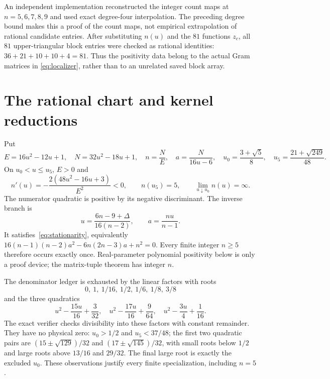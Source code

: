 \documentclass[11pt]{article}
\begin{document}
An independent implementation reconstructed the integer count maps at
$n=5,6,7,8,9$ and used exact degree-four interpolation. The preceding
degree bound makes this a proof of the count maps, not empirical
extrapolation of rational candidate entries. After substituting $n(u)$
and the $81$ functions $z_c$, all $81$ upper-triangular block entries
were checked as rational identities: $36+21+10+10+4=81$.
Thus the positivity data belong to the actual Gram matrices in
\eqref{eq:localizer}, rather than to an unrelated saved block array.

\section{The rational chart and kernel reductions}\label{sec:chart}
Put
\begin{equation}\label{eq:chart}
 E=16u^2-12u+1,\quad N=32u^2-18u+1,\quad
 n=\frac NE,\quad a=\frac N{16u-6},\quad
 u_0=\frac{3+\sqrt5}{8},\quad u_5=\frac{21+\sqrt{249}}{48}.
\end{equation}
On $u_0<u\le u_5$, $E>0$ and
\[
 n'(u)=-\frac{2(48u^2-16u+3)}{E^2}<0,
 \qquad n(u_5)=5,\qquad \lim_{u\downarrow u_0}n(u)=\infty.
\]
The numerator quadratic is positive by its negative discriminant.
The inverse branch is
\[
 u=\frac{6n-9+\Delta}{16(n-2)},\qquad a=\frac{nu}{n-1}.
\]
It satisfies~\eqref{eq:stationarity}, equivalently
$16(n-1)(n-2)a^2-6n(2n-3)a+n^2=0$.
Every finite integer $n\ge5$ therefore occurs exactly once.
Real-parameter polynomial positivity below is only a proof device;
the matrix-tuple theorem has integer $n$.

The denominator ledger is exhausted by the linear factors with roots
\[
 0,\ 1,\ 1/16,\ 1/2,\ 1/6,\ 1/8,\ 3/8
\]
and the three quadratics
\begin{equation}\label{eq:denoms}
 u^2-\frac{15u}{16}+\frac3{32},\quad
 u^2-\frac{17u}{16}+\frac9{64},\quad
 u^2-\frac{3u}{4}+\frac1{16}.
\end{equation}
The exact verifier checks divisibility into these factors with constant
remainder. They have no physical zero: $u_0>1/2$ and $u_5<37/48$;
the first two quadratic pairs are
$(15\pm\sqrt{129})/32$ and $(17\pm\sqrt{145})/32$, with small roots
below $1/2$ and large roots above $13/16$ and $29/32$. The final large
root is exactly the excluded $u_0$. These observations justify every
finite specialization, including $n=5$.
\end{document}

